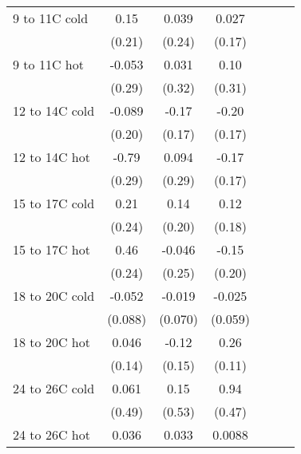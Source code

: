 \documentclass[paper=letterpaper, fontsize=11pt]{article} %
\begin{document}
\begin{longtable}{l*{6}{c}}
9 to 11C cold       &        0.15&       0.039&       0.027&            &            &            \\
                    &      (0.21)&      (0.24)&      (0.17)&            &            &            \\
9 to 11C hot        &      -0.053&       0.031&        0.10&            &            &            \\
                    &      (0.29)&      (0.32)&      (0.31)&            &            &            \\
12 to 14C cold      &      -0.089&       -0.17&       -0.20&            &            &            \\
                    &      (0.20)&      (0.17)&      (0.17)&            &            &            \\
12 to 14C hot       &       -0.79&       0.094&       -0.17&            &            &            \\
                    &      (0.29)&      (0.29)&      (0.17)&            &            &            \\
15 to 17C cold      &        0.21&        0.14&        0.12&            &            &            \\
                    &      (0.24)&      (0.20)&      (0.18)&            &            &            \\
15 to 17C hot       &        0.46&      -0.046&       -0.15&            &            &            \\
                    &      (0.24)&      (0.25)&      (0.20)&            &            &            \\
18 to 20C cold      &      -0.052&      -0.019&      -0.025&            &            &            \\
                    &     (0.088)&     (0.070)&     (0.059)&            &            &            \\
18 to 20C hot       &       0.046&       -0.12&        0.26&            &            &            \\
                    &      (0.14)&      (0.15)&      (0.11)&            &            &            \\
24 to 26C cold      &       0.061&        0.15&        0.94&            &            &            \\
                    &      (0.49)&      (0.53)&      (0.47)&            &            &            \\
24 to 26C hot       &       0.036&       0.033&      0.0088&            &            &            \\

\end{longtable}
\end{document}
